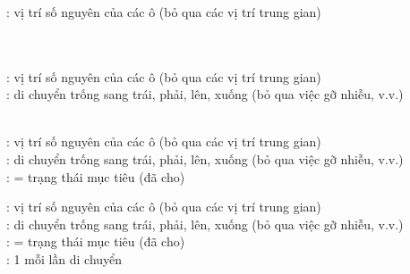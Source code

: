 \documentclass{article}
\begin{document}
\begin{huge}

\textwidth
{}

\\
\\
\\





\textwidth
{}

: vị trí số nguyên của các ô (bỏ qua các vị trí trung gian)\\
\\
\\


\textwidth
{}

: vị trí số nguyên của các ô (bỏ qua các vị trí trung gian)\\
: di chuyển trống sang trái, phải, lên, xuống (bỏ qua việc gỡ nhiễu, v.v.)\\
\\


\textwidth
{}

: vị trí số nguyên của các ô (bỏ qua các vị trí trung gian)\\
: di chuyển trống sang trái, phải, lên, xuống (bỏ qua việc gỡ nhiễu, v.v.)\\
: = trạng thái mục tiêu (đã cho)\\


\textwidth
{}

: vị trí số nguyên của các ô (bỏ qua các vị trí trung gian)\\
: di chuyển trống sang trái, phải, lên, xuống (bỏ qua việc gỡ nhiễu, v.v.)\\
: = trạng thái mục tiêu (đã cho)\\
: 1 mỗi lần di chuyển


\end{huge}
\end{document}

